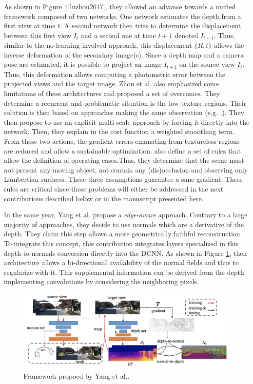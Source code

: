 As shown in Figure \ref{illuzhou2017}, they allowed an advance towards a unified framework composed of two networks. One network estimates the depth from a first view at time $t$. A second network then tries to determine the displacement between this first view $I_t$ and a second one at time $t+1$ denoted $I_{t+1}$. Thus, similar to the no-learning-involved approach, this displacement $\{R,t\}$ allows the inverse deformation of the secondary image(s). Since a depth map and a camera pose are estimated, it is possible to project an image $I_{t+1}$ on the source view $I_{t}$. Thus, this deformation allows computing a photometric error between the projected views and the target image. Zhou et al. also emphasized some limitations of these architectures and proposed a set of overcomes. They determine a recurrent and problematic situation is the low-texture regions. Their solution is then based on approaches making the same observation (e.g. \cite{garg2016unsupervised},\cite{godard2017unsupervised}). They then propose to use an explicit multi-scale approach by forcing it directly into the network. Then, they explain in the cost function a weighted smoothing term. From these two actions, the gradient errors emanating from textureless regions are reduced and allow a sustainable optimization. \cite{zhou2017unsupervised} also define a set of rules that allow the definition of operating cases.Thus, they determine that the scene must not present any moving object, not contain any (dis)occlusion and observing only Lambertian surfaces. These three assumptions guarantee a sane gradient. 
These rules are critical since these problems will either be addressed in the next contributions described below or in the manuscript presented here.


In the same year, Yang et al. \cite{yang2017unsupervised} propose a \emph{edge-aware} approach. Contrary to a large majority of approaches, they decide to use normals which are a derivative of the depth. They claim this step allows a more geometrically faithful reconstruction. To integrate this concept, this contribution integrates layers specialized in this depth-to-normals conversion directly into the DCNN. As shown in Figure \ref{illuyang2017}, their architecture allows a bi-directional availability of the normal fields and thus to regularize with it.
This supplemental information can be derived from the depth implementing convolutions by considering the neighboring pixels.

\begin{figure}[h]
	\centering
	\includegraphics[width=0.8\linewidth]{Figures/SOA/illuyang2017}
	\caption[Framework propoed by Yang et al.]{Framework propoed by Yang et al.\cite{yang2017unsupervised}.}
	\label{illuyang2017}
\end{figure}


